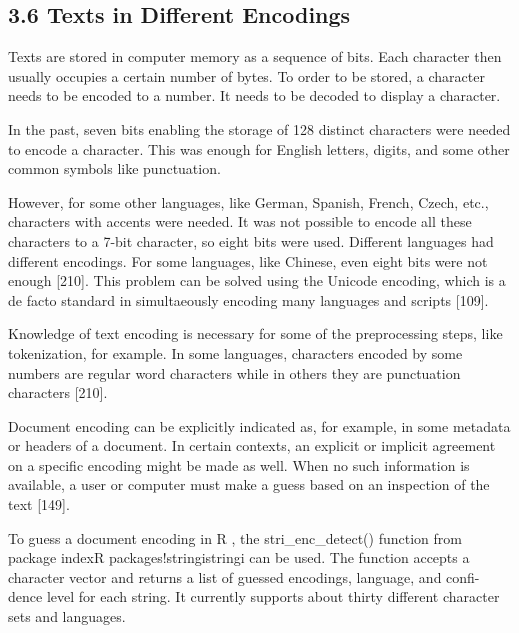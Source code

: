 \documentclass[10pt]{book}
\begin{document}
\subsection*{3.6 Texts in Different Encodings}
Texts are stored in computer memory as a sequence of bits. Each character then usually occupies a certain number of bytes. To order to be stored, a character needs to be encoded to a number. It needs to be decoded to display a character.

In the past, seven bits enabling the storage of 128 distinct characters were needed to encode a character. This was enough for English letters, digits, and some other common symbols like punctuation.

However, for some other languages, like German, Spanish, French, Czech, etc., characters with accents were needed. It was not possible to encode all these characters to a 7-bit character, so eight bits were used. Different languages had different encodings. For some languages, like Chinese, even eight bits were not enough [210]. This problem can be solved using the Unicode encoding, which is a de facto standard in simultaeously encoding many languages and scripts [109].

Knowledge of text encoding is necessary for some of the preprocessing steps, like tokenization, for example. In some languages, characters encoded by some numbers are regular word characters while in others they are punctuation characters [210].

Document encoding can be explicitly indicated as, for example, in some metadata or headers of a document. In certain contexts, an explicit or implicit agreement on a specific encoding might be made as well. When no such information is available, a user or computer must make a guess based on an inspection of the text [149].

To guess a document encoding in R , the stri\_enc\_detect() function from package indexR packages!stringistringi can be used. The function accepts a character vector and returns a list of guessed encodings, language, and confi-\\
dence level for each string. It currently supports about thirty different character sets and languages.
\end{document}
